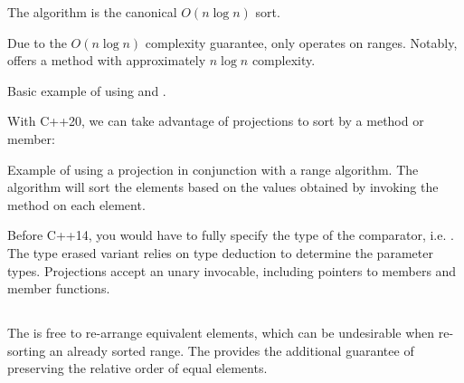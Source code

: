 The  algorithm is the canonical $O(n\log n)$ sort.


Due to the $O(n\log n)$ complexity guarantee,  only operates on  ranges. Notably,  offers a method with approximately $n\log n$ complexity.

\begin{codebox}[]{\href{https://compiler-explorer.com/z/vef61TWj9}{\ExternalLink}}
\footnotesize Basic example of using  and .
\tcblower
{}
\end{codebox}

With C++20, we can take advantage of projections to sort by a method or member:

\begin{codebox}[breakable]{\href{https://compiler-explorer.com/z/4aGenq9b6}{\ExternalLink}}
\footnotesize Example of using a projection in conjunction with a range algorithm. The algorithm will sort the elements based on the values obtained by invoking the method  on each element.
\tcblower
{}
\end{codebox}

Before C++14, you would have to fully specify the type of the comparator, i.e. . The type erased variant  relies on type deduction to determine the parameter types. Projections accept an unary invocable, including pointers to members and member functions.

\subsection{\texorpdfstring{}{\texttt{std::stable\_sort}}}

The  is free to re-arrange equivalent elements, which can be undesirable when re-sorting an already sorted range. The  provides the additional guarantee of preserving the relative order of equal elements.


